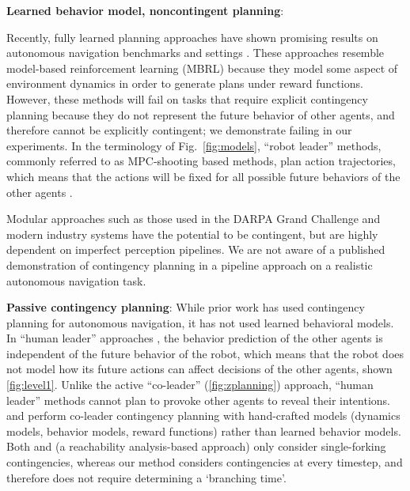 \documentclass[conference]{IEEEtran}
\newcommand{\mypara}[1]{\vspace{1mm}\noindent\textbf{#1}:}
\begin{document}
\mypara{Learned behavior model, noncontingent planning}

Recently, fully learned planning approaches have shown promising results on autonomous navigation benchmarks and settings \cite{rhinehart2020deep,zeng2019end,filos2020can}. These approaches resemble model-based reinforcement learning (MBRL) because they model some aspect of environment dynamics in order to generate plans under reward functions. However, these methods will fail on tasks that require explicit contingency planning because they do not represent the future behavior of other agents, and therefore cannot be explicitly contingent; we demonstrate \cite{rhinehart2020deep} failing in our experiments. In the terminology of Fig.~\ref{fig:models}, ``robot leader'' methods, commonly referred to as MPC-shooting based methods, plan {action trajectories}, which means that the actions will be fixed for all possible future behaviors of the other agents \citep{sadigh2016planning,schmerling2018multimodal,tang2019mfp}. 

Modular approaches such as those used in the DARPA Grand Challenge \citep{thrun2006stanley,urmson2008autonomous} and modern industry systems \citep{paden2016survey} have the potential to be contingent, but are highly dependent on imperfect perception pipelines. We are not aware of a published demonstration of contingency planning in a pipeline approach on a realistic autonomous navigation task. 

\mypara{Passive contingency planning}
While prior work has used contingency planning for autonomous navigation, it has not used learned behavioral models.
In ``human leader'' approaches \citep{hardy2013contingency,zhan2016non,cui2021lookout}, the behavior prediction of the other agents is independent of the future behavior of the robot, which means that the robot does not model how its future actions can affect decisions of the other agents, shown \cref{fig:level1}. Unlike the active ``co-leader'' (\cref{fig:zplanning}) approach, ``human leader'' methods cannot plan to provoke other agents to reveal their intentions. 
\citet{galceran2017multipolicy} and \citet{fisac2019hierarchical} perform co-leader contingency planning with hand-crafted models (dynamics models, behavior models, reward functions) rather than learned behavior models.
Both \citet{cui2021lookout} and \citet{bajcsy2021analyzing} (a reachability analysis-based approach) only consider single-forking contingencies, whereas our method considers contingencies at every timestep, and therefore does not require determining a `branching time'.
\end{document}
